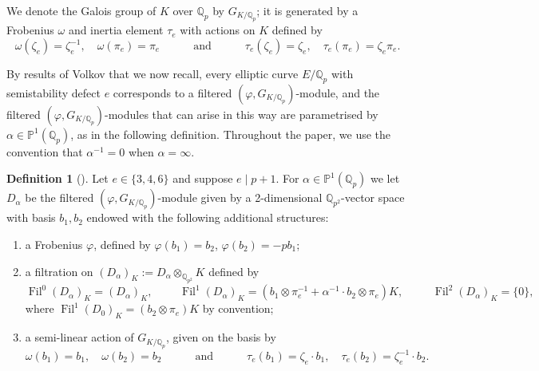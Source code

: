 \documentclass{amsart}
\newcommand{\Qp}{\mathbb{Q}_p}
\theoremstyle{definition}
\newtheorem{definition}[theorem]{Definition}
\newcommand{\Q}{\mathbb{Q}}
\newcommand{\Dbasis}{b}
\numberwithin{theorem}{section}
\numberwithin{equation}{section}
\begin{document}
We denote the Galois group of $K$ over $\Qp$ by $G_{K/\Qp}$; it is generated by a Frobenius $\omega$ and inertia element $\tau_e$ with actions on $K$ defined by
\[
\omega(\zeta_e)=\zeta_e^{-1}, \quad \omega(\pi_e)=\pi_e \qquad\quad \text{and} \qquad\quad
\tau_e(\zeta_e)=\zeta_e, \quad \tau_e(\pi_e)=\zeta_e \pi_e.
\]

By results of Volkov that we now recall, every elliptic curve $E/\mathbb{Q}_p$ with semistability defect $e$ corresponds to a filtered $(\varphi, G_{K/\mathbb{Q}_p})$-module, and the filtered $(\varphi, G_{K/\mathbb{Q}_p})$-modules that can arise in this way are parametrised by $\alpha \in \mathbb{P}^1(\mathbb{Q}_p)$, as in the following definition. Throughout the paper, we use the convention that $\alpha^{-1}=0$ when $\alpha=\infty$.

\begin{definition}[{\cite[p.~125]{Volkov}}]\label{def: D alpha}
Let $e \in \{3, 4, 6\}$ and suppose $e \mid p+1$. For $\alpha \in \mathbb{P}^1(\mathbb{Q}_p)$ we let $D_\alpha$ be the filtered $(\varphi, G_{K/\mathbb{Q}_p})$-module given by a 2-dimensional $\mathbb{Q}_{p^2}$-vector space with basis $\Dbasis_1, \Dbasis_2$ endowed with the following additional structures:
    
  \begin{enumerate}
        \item a Frobenius $\varphi$, defined by $\varphi(\Dbasis_1) = \Dbasis_2$, $\varphi(\Dbasis_2) = -p\Dbasis_1$;
        \item a filtration on $(D_\alpha)_K := D_\alpha \otimes_{\mathbb{Q}_{p^2}} K$ defined by
        \[
        \operatorname{Fil}^0(D_\alpha)_K = (D_\alpha)_K, \qquad \,\, \operatorname{Fil}^1 (D_\alpha)_K = (\Dbasis_1 \otimes \pi_e^{-1} + \alpha^{-1} \cdot \Dbasis_2 \otimes \pi_e)K, \qquad \,\,\ \operatorname{Fil}^2(D_\alpha)_K = \{0\},
        \]
        where $\operatorname{Fil}^1(D_0)_K = (\Dbasis_2 \otimes \pi_e)K$ by convention;
        \item a semi-linear action of $G_{K/\Q_p}$,
        given on the basis by
        \[
        \omega(\Dbasis_1) = \Dbasis_1, \quad \omega(\Dbasis_2)=\Dbasis_2 \quad\qquad \text{and} \quad\qquad \tau_e(\Dbasis_1) = \zeta_e \cdot \Dbasis_1, \quad \tau_e(\Dbasis_2) = \zeta_e^{-1} \cdot \Dbasis_2.
        \]
    \end{enumerate}
\end{definition}
\end{document}
